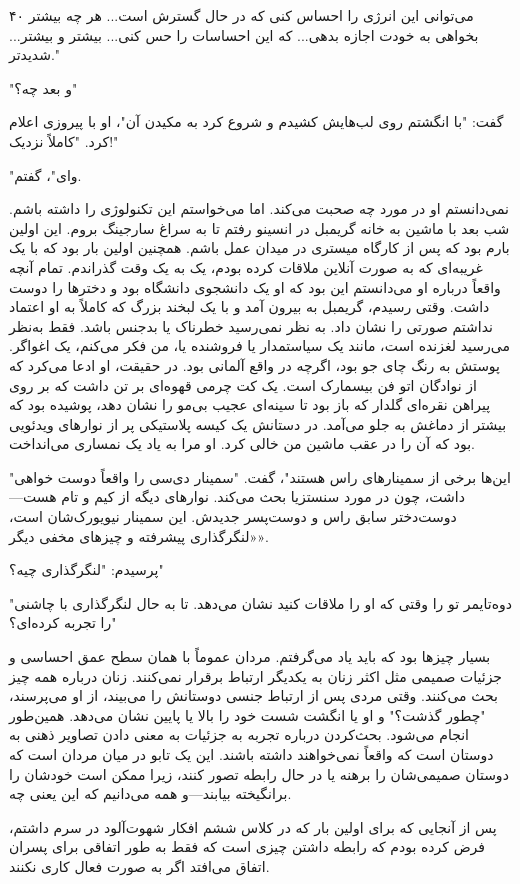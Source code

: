 ۴۰  
می‌توانی این انرژی را احساس کنی که در حال گسترش است... هر چه بیشتر بخواهی به خودت اجازه بدهی... که این احساسات را حس کنی... بیشتر و بیشتر... شدیدتر."

"و بعد چه؟"

گفت: "با انگشتم روی لب‌هایش کشیدم و شروع کرد به مکیدن آن"، او با پیروزی اعلام کرد. "کاملاً نزدیک!"

"وای"، گفتم.

نمی‌دانستم او در مورد چه صحبت می‌کند. اما می‌خواستم این تکنولوژی را داشته باشم. شب بعد با ماشین به خانه گریمبل در انسینو رفتم تا به سراغ سارجینگ بروم. این
اولین بارم بود که پس از کارگاه میستری در میدان عمل باشم. همچنین اولین بار بود که با یک غریبه‌ای که به صورت آنلاین ملاقات کرده بودم، یک به یک وقت گذراندم. تمام
آنچه واقعاً درباره او می‌دانستم این بود که او یک دانشجوی دانشگاه بود و دختر‌ها را دوست داشت.
وقتی رسیدم، گریمبل به بیرون آمد و با یک لبخند بزرگ که کاملاً به او اعتماد نداشتم صورتی را نشان داد. به نظر نمی‌رسید خطرناک یا بدجنس باشد. فقط به‌نظر می‌رسید لغزنده است، مانند یک سیاستمدار یا فروشنده یا، من فکر می‌کنم، یک اغواگر. پوستش به رنگ چای جو بود، اگرچه در واقع آلمانی بود. در حقیقت، او ادعا می‌کرد که از نوادگان اتو فن بیسمارک است. یک کت چرمی قهوه‌ای بر تن داشت که بر روی پیراهن نقره‌ای گلدار که باز بود تا سینه‌ای عجیب بی‌مو را نشان دهد، پوشیده بود که بیشتر از دماغش به جلو می‌آمد. در دستانش یک کیسه پلاستیکی پر از نوارهای ویدئویی بود که آن را در عقب ماشین من خالی کرد. او مرا به یاد یک نمساری می‌انداخت.

"این‌ها برخی از سمینارهای راس هستند"، گفت. "سمینار دی‌سی را واقعاً دوست خواهی داشت، چون در مورد سنستزیا بحث می‌کند. نوارهای دیگه از کیم و تام هست—دوست‌دختر سابق راس و دوست‌پسر جدیدش. این سمینار نیویورک‌شان است، «لنگرگذاری پیشرفته و چیزهای مخفی دیگر».

پرسیدم: "لنگرگذاری چیه؟"

"دوه‌تایمر تو را وقتی که او را ملاقات کنید نشان می‌دهد. تا به حال لنگرگذاری با چاشنی را تجربه کرده‌ای؟"

بسیار چیزها بود که باید یاد می‌گرفتم. مردان عموماً با همان سطح عمق احساسی و جزئیات صمیمی مثل اکثر زنان به یکدیگر ارتباط برقرار نمی‌کنند. زنان درباره همه چیز بحث می‌کنند. وقتی مردی پس از ارتباط جنسی دوستانش را می‌بیند، از او می‌پرسند، "چطور گذشت؟" و او یا انگشت شست خود را بالا یا پایین نشان می‌دهد. همین‌طور انجام می‌شود. بحث‌کردن درباره تجربه به جزئیات به معنی دادن تصاویر ذهنی به دوستان است که واقعاً نمی‌خواهند داشته باشند. این یک تابو در میان مردان است که دوستان صمیمی‌شان را برهنه یا در حال رابطه تصور کنند، زیرا ممکن است خودشان را برانگیخته بیابند—و همه می‌دانیم که این یعنی چه.

پس از آنجایی که برای اولین بار که در کلاس ششم افکار شهوت‌آلود در سرم داشتم، فرض کرده بودم که رابطه داشتن چیزی است که فقط به طور اتفاقی برای پسران اتفاق می‌افتد اگر به صورت فعال کاری نکنند.